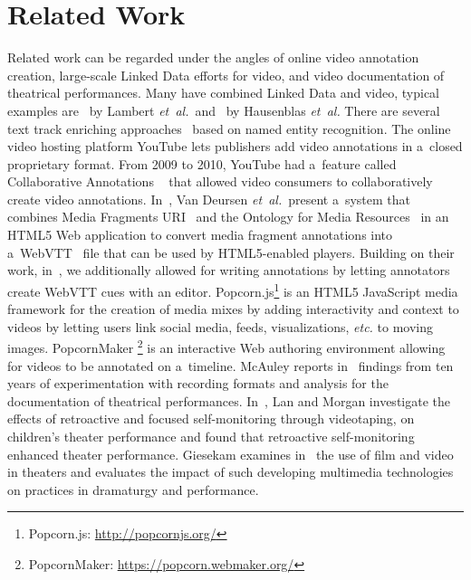 \documentclass[runningheads,a4paper]{llncs}
\begin{document}
\section{Related Work}

Related work can be regarded under the angles
of online video annotation creation, large-scale Linked Data 
efforts for video, and video documentation of theatrical performances.
Many have combined Linked Data and video,
typical examples are~\cite{lambert2010linkeddata} by Lambert \emph{et~al.}\
and~\cite{hausenblas2009im} by Hausenblas \emph{et~al.}
There are several text track enriching approaches~\cite{li2013enriching,li2012creating,yi2012synote,steiner2010semwebvid}
based on named entity recognition.
The online video hosting platform YouTube
lets publishers add video annotations
in a~closed proprietary format.
From 2009 to 2010, YouTube had a~feature called
Collaborative Annotations%
~\cite{fink2009collaborativeannotations}
that allowed video consumers to collaboratively
create video annotations.
In~\cite{vandeursen2012mediafragmentannotations},
Van Deursen \emph{et~al.}\ present a~system
that combines Media Fragments URI~\cite{troncy2012mediafragments}
and the Ontology for Media Resources~\cite{lee2012mediaontology}
in an HTML5 Web application to convert
media fragment annotations into a~WebVTT~\cite{pfeiffer2013webvtt} file
that can be used by HTML5-enabled players.
Building on their work, in~\cite{steiner2014webvtt},
we additionally allowed for writing annotations by
letting annotators create WebVTT cues with an editor.
Popcorn.js\footnote{Popcorn.js: \url{http://popcornjs.org/}}
is an HTML5 JavaScript media framework
for the creation of media mixes
by adding interactivity and context to videos
by letting users link social media, feeds,
visualizations, \emph{etc.} to moving images.
PopcornMaker%
\footnote{PopcornMaker: \url{https://popcorn.webmaker.org/}}
is an interactive Web authoring environment
allowing for videos to be annotated on a~timeline.
McAuley reports in~\cite{mcauley1994video} findings from ten years of experimentation
with recording formats and analysis for the documentation of theatrical performances.
In~\cite{lan2003video}, Lan and Morgan investigate the effects of retroactive and
focused self-monitoring through videotaping, on children's theater performance
and found that retroactive self-monitoring enhanced theater performance.
Giesekam examines in~\cite{giesekam2007staging} the use of film and video in theaters
and evaluates the impact of such developing multimedia technologies on practices in dramaturgy and performance.
\end{document}
